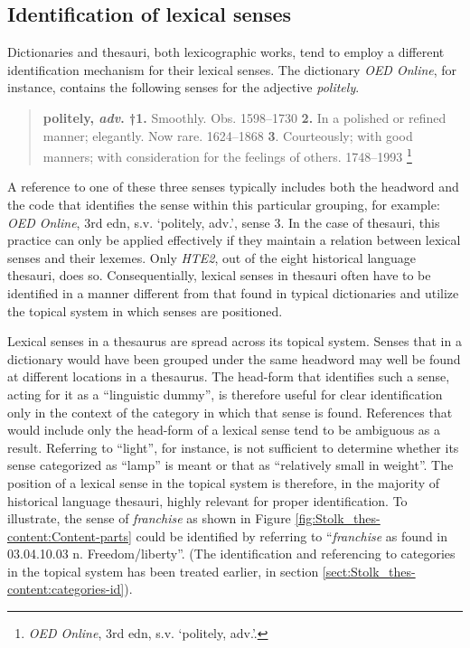 \subsection{Identification of lexical senses}

Dictionaries and thesauri, both lexicographic works, tend to employ a different identification mechanism for their lexical senses.
The dictionary \textit{OED Online}, for instance, contains the following senses for the adjective \textit{politely}.
\begin{quotation} \noindent
\textbf{politely, \textit{adv}. †1.} Smoothly. Obs. 1598--1730  \textbf{2.} In a polished or refined manner; elegantly. Now rare. 1624--1868  \textbf{3}. Courteously; with good manners; with consideration for the feelings of others. 1748--1993 \footnote{\textit{OED Online}, 3rd edn, s.v. `politely, adv.'. %
}
\end{quotation}
A reference to one of these three senses typically includes both the headword and the code that identifies the sense within this particular grouping, for example: \textit{OED Online}, 3rd edn, s.v. `politely, adv.', sense 3. In the case of thesauri, this practice can only be applied effectively if they maintain a relation between lexical senses and their lexemes. Only \textit{HTE2}, out of the eight historical language thesauri, does so. Consequentially, lexical senses in thesauri often have to be identified in a manner different from that found in typical dictionaries and utilize the topical system in which senses are positioned.

Lexical senses in a thesaurus are spread across its topical system. Senses that in a dictionary would have been grouped under the same headword may well be found at different locations in a thesaurus. The head-form that identifies such a sense, acting for it as a ``linguistic dummy'', is therefore useful for clear identification only in the context of the category in which that sense is found. References that would include only the head-form of a lexical sense tend to be ambiguous as a result. Referring to ``light'', for instance, is not sufficient to determine whether its sense categorized as ``lamp'' is meant or that as ``relatively small in weight''. The position of a lexical sense in the topical system is therefore, in the majority of historical language thesauri, highly relevant for proper identification. To illustrate, the sense of \textit{franchise} as shown in Figure \ref{fig:Stolk_thes-content:Content-parts} could be identified by referring to ``\textit{franchise} as found in 03.04.10.03 n. Freedom/liberty''.
(The identification and referencing to categories in the topical system has been treated earlier, in section \ref{sect:Stolk_thes-content:categories-id}). 

